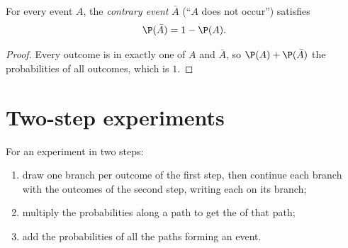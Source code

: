 \begin{proposition}[Complement]\label{prop:g9:statproba:complement}
For every event $A$, the \emph{contrary event} $\bar A$ (``$A$ does not
occur'') satisfies
\[
\P(\bar A) = 1 - \P(A).
\]
\end{proposition}

\begin{proof}
Every outcome is in exactly one of $A$ and $\bar A$, so
$\P(A) + \P(\bar A)$  the probabilities of all outcomes, which is
$1$.
\end{proof}

\section{Two-step experiments}

\begin{method}\label{met:g9:statproba:tree}
For an experiment in two steps:
\begin{enumerate}
  \item draw one branch per outcome of the first step, then continue
        each branch with the outcomes of the second step, writing each
         on its branch;
  \item multiply the probabilities along a path to get the 
        of that path;
  \item add the probabilities of all the paths forming an event.
\end{enumerate}
\end{method}

